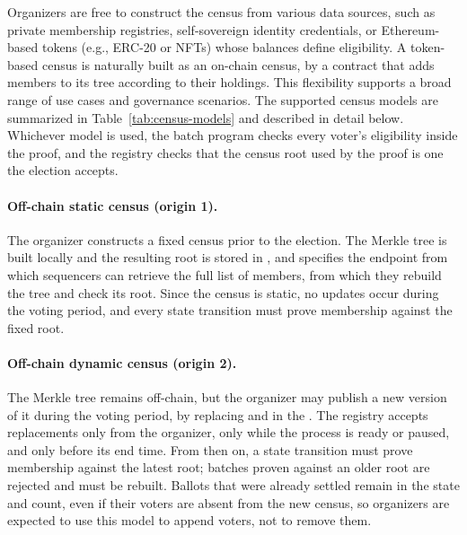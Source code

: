 %
Organizers are free to construct the census from various data sources, such as private membership registries, self-sovereign identity credentials, or Ethereum-based tokens (e.g., ERC-20 or NFTs) whose balances define eligibility. A token-based census is naturally built as an on-chain census, by a contract that adds members to its tree according to their holdings.
This flexibility supports a broad range of use cases and governance scenarios.
%
The supported census models are summarized in Table~\ref{tab:census-models} and described in detail below. Whichever model is used, the batch program checks every voter's eligibility inside the proof, and the registry checks that the census root used by the proof is one the election accepts.

\paragraph{Off-chain static census (origin 1).} The organizer constructs a fixed census prior to the election. The Merkle tree is built locally and the resulting root is stored in \censusroot, and \censusuri specifies the endpoint from which sequencers can retrieve the full list of members, from which they rebuild the tree and check its root. Since the census is static, no updates occur during the voting period, and every state transition must prove membership against the fixed root.

\paragraph{Off-chain dynamic census (origin 2).} The Merkle tree remains off-chain, but the organizer may publish a new version of it during the voting period, by replacing \censusroot and \censusuri in the \hlget{\processregistry}. The registry accepts replacements only from the organizer, only while the process is ready or paused, and only before its end time. From then on, a state transition must prove membership against the latest root; batches proven against an older root are rejected and must be rebuilt. Ballots that were already settled remain in the state and count, even if their voters are absent from the new census, so organizers are expected to use this model to append voters, not to remove them.

